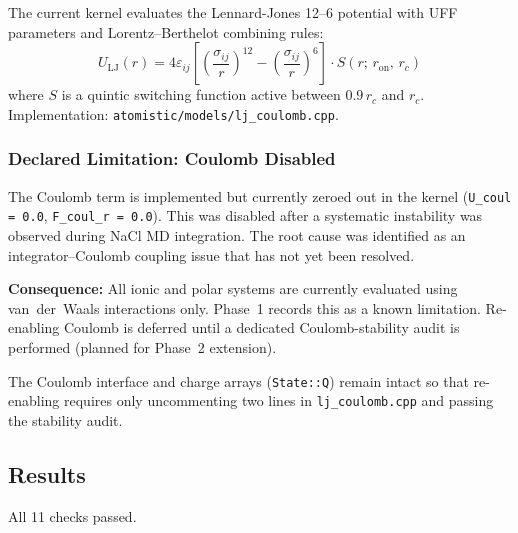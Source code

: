 \documentclass[11pt]{article}
\begin{document}
The current kernel evaluates the Lennard-Jones 12--6 potential with UFF
parameters and Lorentz--Berthelot combining rules:
\begin{equation}
U_{\mathrm{LJ}}(r) = 4\varepsilon_{ij}
    \left[\left(\frac{\sigma_{ij}}{r}\right)^{12}
    - \left(\frac{\sigma_{ij}}{r}\right)^{6}\right]
    \cdot S(r;\, r_{\mathrm{on}},\, r_c)
\end{equation}
where $S$ is a quintic switching function active between $0.9\,r_c$ and
$r_c$.  Implementation: \texttt{atomistic/models/lj\_coulomb.cpp}.

\subsubsection{Declared Limitation: Coulomb Disabled}

The Coulomb term is implemented but currently zeroed out in the kernel
(\texttt{U\_coul = 0.0}, \texttt{F\_coul\_r = 0.0}).  This was disabled
after a systematic instability was observed during NaCl MD integration.
The root cause was identified as an integrator--Coulomb coupling issue
that has not yet been resolved.

\textbf{Consequence:} All ionic and polar systems are currently evaluated
using van~der~Waals interactions only.  Phase~1 records this as a known
limitation.  Re-enabling Coulomb is deferred until a dedicated
Coulomb-stability audit is performed (planned for Phase~2 extension).

The Coulomb interface and charge arrays (\texttt{State::Q}) remain intact
so that re-enabling requires only uncommenting two lines in
\texttt{lj\_coulomb.cpp} and passing the stability audit.

\subsection{Results}

All 11 checks passed.
\end{document}
